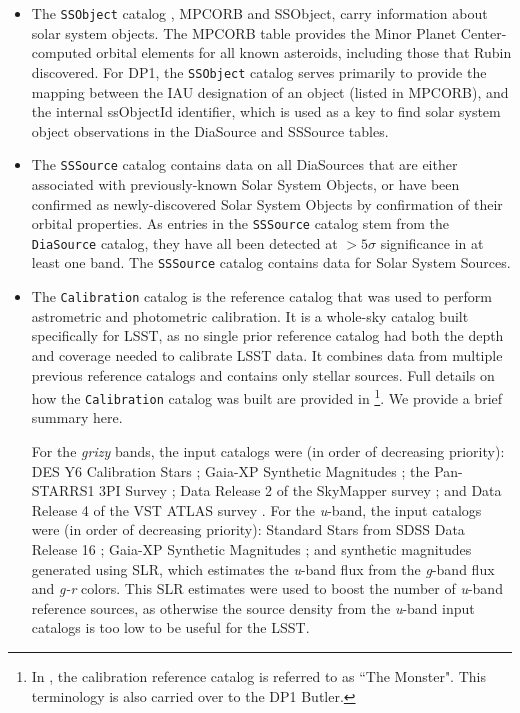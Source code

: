\begin{itemize}
\item The \texttt{SSObject} catalog \citep{10.71929/rubin/2570335}, \gls{MPCORB} and SSObject, carry information about solar system objects. 
The \gls{MPCORB} table provides the Minor Planet \gls{Center}-computed orbital elements for all known asteroids, including those that Rubin discovered. 
For DP1, the  \texttt{SSObject} catalog serves primarily to provide the mapping between the \gls{IAU} designation of an object (listed in \gls{MPCORB}), and the internal ssObjectId identifier, which is used as a key to find solar system object observations in the DiaSource and SSSource tables.
\item The \texttt{SSSource} catalog \citep{10.71929/rubin/2570333} contains data on all DiaSources that are either associated with previously-known Solar System Objects, or have been confirmed as newly-discovered Solar System Objects by confirmation of their orbital properties. 
As entries in the \texttt{SSSource} catalog stem from the \texttt{DiaSource} catalog, they have all been detected at $>5\sigma$ significance in at least one band.
The \texttt{SSSource} catalog contains data for \nsolarsystemsources Solar System Sources.

\item The \texttt{Calibration} catalog is the reference catalog that was used to perform astrometric and photometric \gls{calibration}. 
It is a whole-sky catalog built specifically for \gls{LSST}, as no single prior reference catalog had both the depth and coverage needed to calibrate \gls{LSST} data.
It combines data from multiple previous reference catalogs and contains only stellar sources.
Full details on how the \texttt{Calibration} catalog was built are provided in \cite{DMTN-277}
\footnote{In \cite{DMTN-277},  the calibration reference catalog is referred to as ``The Monster". This terminology is also carried over to the DP1 Butler.}. 
We provide a brief summary here.

For the \textit{grizy} bands, the input catalogs were (in order of decreasing priority): \gls{DES} Y6 Calibration Stars \citep{2023arXiv230501695R}; Gaia-\gls{XP} Synthetic Magnitudes \citep{2023A&A...674A..33G}; the \gls{Pan-STARRS}1 3PI Survey \citep{2016arXiv161205560C}; \gls{Data Release} 2 of the  SkyMapper survey \citep{2019PASA...36...33O}; and \gls{Data Release} 4 of the \gls{VST} \gls{ATLAS} survey \citep{2015MNRAS.451.4238S}. 
For the \textit{u}-band, the input catalogs were (in order of decreasing priority): Standard Stars from \gls{SDSS} \gls{Data Release} 16 \citep{2020ApJS..249....3A}; Gaia-\gls{XP} Synthetic Magnitudes \citep{2023A&A...674A..33G}; and synthetic magnitudes generated using \gls{SLR}, which estimates the \textit{u}-band \gls{flux} from the \textit{g}-band \gls{flux} and \textit{g-r} colors. 
This \gls{SLR} estimates were used to boost the number of \textit{u}-band reference sources, as otherwise the source density from the \textit{u}-band input catalogs is too low to be useful for the \gls{LSST}.


\end{itemize}
